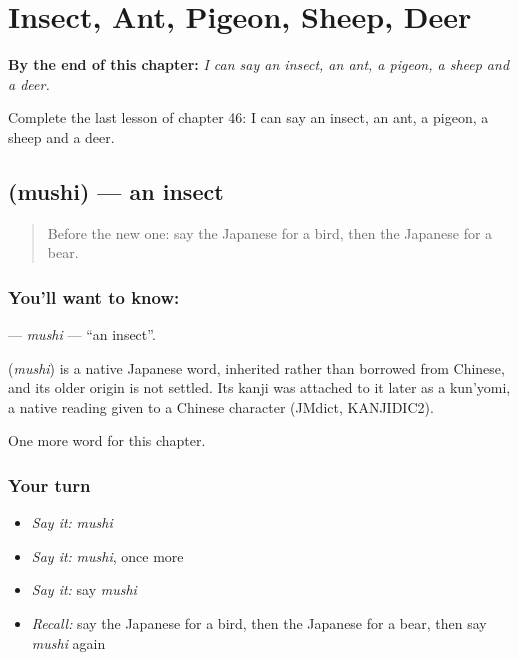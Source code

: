 
\chapter{Insect, Ant, Pigeon, Sheep, Deer}
\label{ch:ja-insect-ant-pigeon-sheep-deer}

\begin{chapteropening}
\textbf{By the end of this chapter:} \emph{I can say an insect, an ant, a pigeon, a sheep and a deer.}

Complete the last lesson of chapter 46: I can say an insect, an ant, a pigeon, a sheep and a deer.
\end{chapteropening}

\section[\texorpdfstring{\ja{むし} (mushi)}{むし (mushi)}]{ (mushi) — an insect}

\label{lesson:JA-C46-mushi}



\begin{quote}
Before the new one: say the Japanese for a bird, then the Japanese for a bear.
\end{quote}

\subsection*{You'll want to know: }
\textbf{} — \emph{mushi} — \textquotedblleft{}an insect\textquotedblright{}.

\begin{cousinweb}
\textbf{} (\emph{mushi}) is a native Japanese word, inherited rather than borrowed from Chinese, and its older origin is not settled. Its kanji was attached to it later as a kun'yomi, a native reading given to a Chinese character (JMdict, KANJIDIC2).
\end{cousinweb}

\begin{grammarlens}[title={What you've built}]
One more word for this chapter.
\end{grammarlens}

\subsection*{Your turn}
\begin{itemize}
\raggedright
  \item \emph{Say it:} \emph{mushi}
  \item \emph{Say it:} \emph{mushi}, once more
  \item \emph{Say it:} say \emph{mushi}
  \item \emph{Recall:} say the Japanese for a bird, then the Japanese for a bear, then say \emph{mushi} again
\end{itemize}

